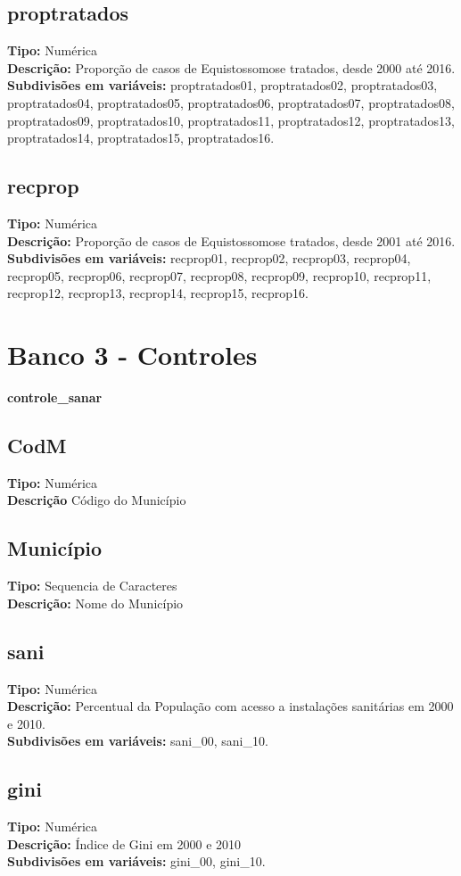 \documentclass[12pt]{article}
\begin{document}
		\subsection{proptratados}
		{\bf Tipo:} Numérica \\
		{\bf Descrição:} Proporção de casos de Equistossomose tratados, desde 2000 até 2016.\\
		{\bf Subdivisões em variáveis:} proptratados01,  proptratados02,  proptratados03,  proptratados04,  proptratados05,
		 proptratados06,  proptratados07,  proptratados08,  proptratados09,  proptratados10,  proptratados11,  proptratados12,
		 proptratados13,  proptratados14, proptratados15, proptratados16.
		\subsection{recprop}
		{\bf Tipo:} Numérica \\
		{\bf Descrição:} Proporção de casos de Equistossomose tratados, desde 2001 até 2016.\\
		{\bf Subdivisões em variáveis:} recprop01, recprop02, recprop03, recprop04, recprop05, recprop06, recprop07, recprop08, recprop09, recprop10, recprop11, recprop12, recprop13, recprop14, recprop15, recprop16.
		\section{Banco 3 - Controles}
		{\bf controle\_sanar}
		\subsection{CodM}
		{\bf Tipo:} Numérica \\
		{\bf Descrição} Código do Município \\
		\subsection{Município}
		{\bf Tipo:} Sequencia de Caracteres \\
		{\bf Descrição:} Nome do Município 
		\subsection{sani}
		{\bf Tipo:} Numérica \\
		{\bf Descrição:} Percentual da População com acesso a instalações sanitárias em 2000 e 2010. \\
		{\bf Subdivisões em variáveis:} sani\_00, sani\_10.
		\subsection{gini}
		{\bf Tipo:} Numérica \\
		{\bf Descrição:} Índice de Gini em 2000 e 2010 \\
		{\bf Subdivisões em variáveis:} gini\_00, gini\_10.
\end{document}

